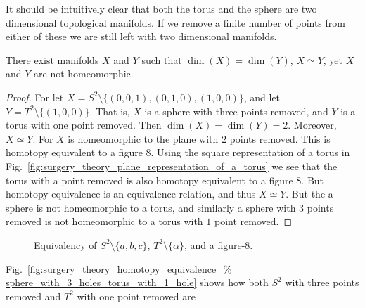 \documentclass[crop=false,class=book,oneside]{standalone}                      %
\begin{document}
            It should be intuitively clear that both the torus and the sphere
            are two dimensional topological manifolds. If we remove a finite
            number of points from either of these we are still left with
            two dimensional manifolds.
            \begin{theorem}
                There exist manifolds $X$ and $Y$ such that
                $\dim(X)=\dim(Y)$, ${X}\simeq{Y}$,
                yet $X$ and $Y$ are not homeomorphic.
            \end{theorem}
            \begin{proof}
                For let $X=S^{2}\setminus\{(0,0,1),(0,1,0),(1,0,0)\}$,
                and let $Y=T^{2}\setminus\{(1,0,0)\}$.
                That is, $X$ is a sphere with three points removed,
                and $Y$ is a torus with one point removed. Then
                $\dim(X)=\dim(Y)=2$.
                Moreover, $X\simeq Y$. For $X$ is homeomorphic
                to the plane with $2$ points removed. This is
                homotopy equivalent to a figure $8$.
                Using the square representation of a torus in
                Fig.~\ref{fig:surgery_theory_plane_representation_of_a_torus}
                we see that the torus with a point removed
                is also homotopy equivalent to a figure $8$.
                But homotopy equivalence is an equivalence
                relation, and thus $X\simeq Y$. But the a sphere
                is not homeomorphic to a torus, and similarly a
                sphere with $3$ points removed is not homeomorphic
                to a torus with $1$ point removed.
            \end{proof}
            \begin{figure}[H]
                    \centering
                    \captionsetup{type=figure}
                    \caption{Equivalency of $S^{2}\setminus\{a,b,c\}$,
                             $T^{2}\setminus\{\alpha\}$, and a figure-8.}
                    \label{fig:surgery_theory_homotopy_equivalence_%
                           sphere_with_3_holes_torus_with_1_hole}
            \end{figure} 
            Fig.~\ref{fig:surgery_theory_homotopy_equivalence_%
                      sphere_with_3_holes_torus_with_1_hole}
            shows how both $S^{2}$ with three points
            removed and $T^{2}$ with one point removed are
\end{document}

